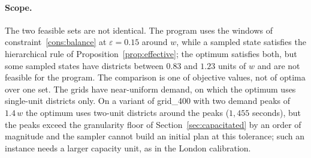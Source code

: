 \paragraph{Scope.}
The two feasible sets are not identical. The program uses the windows of constraint~\eqref{cons:balance} at $\varepsilon = 0.15$ around $w$, while a sampled state satisfies the hierarchical rule of Proposition~\ref{prop:effective}; the optimum satisfies both, but some sampled states have districts between $0.83$ and $1.23$ units of $w$ and are not feasible for the program. The comparison is one of objective values, not of optima over one set. The grids have near-uniform demand, on which the optimum uses single-unit districts only. On a variant of grid\_400 with two demand peaks of $1.4\,w$ the optimum uses two-unit districts around the peaks ($1{,}455$ seconds), but the peaks exceed the granularity floor of Section~\ref{sec:capacitated} by an order of magnitude and the sampler cannot build an initial plan at this tolerance; such an instance needs a larger capacity unit, as in the London calibration.
